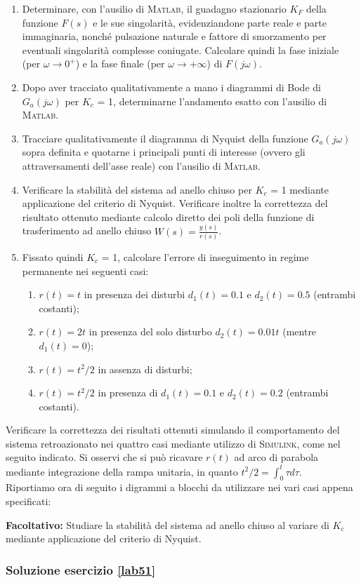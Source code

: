 \documentclass[../main.tex]{subfiles}
\begin{document}
\begin{enumerate}[label=\alph*]
	\item Determinare, con l’ausilio di \textsc{Matlab}, il guadagno stazionario $K_F$ della funzione $F(s)$ e le sue singolarità, evidenziandone parte reale e parte immaginaria, nonché pulsazione naturale e fattore di smorzamento per eventuali singolarità complesse coniugate. Calcolare quindi la fase iniziale (per $\omega \rightarrow 0^+$) e la fase finale (per $\omega \rightarrow +\infty$) di $F(j \omega)$.
	\item Dopo aver tracciato qualitativamente a mano i diagrammi di Bode di $G_a(j\omega)$ per $K_c$ = 1, determinarne l’andamento esatto con l’ausilio di \textsc{Matlab}.
	\item Tracciare qualitativamente il diagramma di Nyquist della funzione $G_a(j\omega)$ sopra definita e quotarne i principali punti di interesse (ovvero gli attraversamenti dell’asse reale) con l’ausilio di \textsc{Matlab}.
	\item Verificare la stabilità del sistema ad anello chiuso per $K_c$ = 1 mediante applicazione del criterio di Nyquist. Verificare inoltre la correttezza del risultato ottenuto mediante calcolo diretto dei poli della funzione di trasferimento ad anello chiuso $W(s) = \frac{y(s)}{r(s)}$.
	\item Fissato quindi $K_c$ = 1, calcolare l’errore di inseguimento in regime permanente nei seguenti casi:
	\begin{enumerate}
	\item $r(t) = t$ in presenza dei disturbi $d_1(t) = 0.1$ e $d_2(t) = 0.5$ (entrambi costanti);
	\item $r(t) = 2t$ in presenza del solo disturbo $d_2(t) = 0.01t$ (mentre $d_1(t) = 0$);
	\item $r(t) = t^2 / 2$ in assenza di disturbi;
	\item $r(t) = t^2 / 2$ in presenza di $d_1(t) = 0.1$ e $d_2(t) = 0.2$ (entrambi costanti).
	\end{enumerate}
\end{enumerate}

Verificare la correttezza dei risultati ottenuti simulando il comportamento del sistema retroazionato nei quattro casi mediante utilizzo di \textsc{Simulink}, come nel seguito indicato. Si osservi che si può ricavare $r(t)$ ad arco di parabola mediante integrazione della rampa unitaria, in quanto $ t^2 / 2 = \int_0^t \tau d \tau$.\\


Riportiamo ora di seguito i digrammi a blocchi da utilizzare nei vari casi appena specificati:






\textbf{Facoltativo:} Studiare la stabilità del sistema ad anello chiuso al variare di $K_c$ mediante applicazione del criterio di Nyquist.


\subsubsection*{Soluzione esercizio \ref{lab51}}
\end{document}
